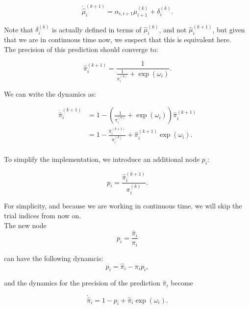 \begin{equation}
	\dot{\hat{\mu}}_i^{(k+1)} = \alpha_{i,i+1} \mu_{i+1}^{(k)} + \delta_i^{(k)}. 
\end{equation}

Note that $\delta_i^{(k)}$ is actually defined in terms of $\hat{\mu}_i^{(k)}$, and not $\hat{\mu}_i^{(k+1)}$, but given that we are in continuous time now, we suspect that this is equivalent here.\\

The precision of this prediction should converge to:

\begin{equation}
	\hat{\pi}_i^{(k+1)} = \frac{1}{\frac{1}{\pi_i^{(k)}} + \exp(\omega_i)}.
\end{equation}

We can write the dynamics as:

\begin{equation}
	\begin{split}
		\dot{\hat{\pi}}_i^{(k+1)} &= 1 - (\frac{1}{\pi_i^{(k)}} + \exp(\omega_i)) \hat{\pi}_i^{(k+1)}\\
		&= 1 - \frac{\hat{\pi}_i^{(k+1)}}{\pi_i^{(k)}} + \hat{\pi}_i^{(k+1)} \exp(\omega_i).\\
	\end{split}
\end{equation}

To simplify the implementation, we introduce an additional node $p_i$:

\begin{equation}
	p_i = \frac{\hat{\pi}_i^{(k+1)}}{\pi_i^{(k)}}.
\end{equation}

For simplicity, and because we are working in continuous time, we will skip the trial indices from now on. \\

The new node 	
\begin{equation}
	p_i = \frac{\hat{\pi}_i}{\pi_i}
\end{equation}

can have the following dynamcis:
\begin{equation}
	\dot{p}_i = \hat{\pi}_i - \pi_i p_i, 
\end{equation}

and the dynamics for the precision of the prediction $\hat{\pi}_i$ become

\begin{equation}
	\dot{\hat{\pi}}_i = 1 - p_i + \hat{\pi}_i \exp(\omega_i).
\end{equation}

